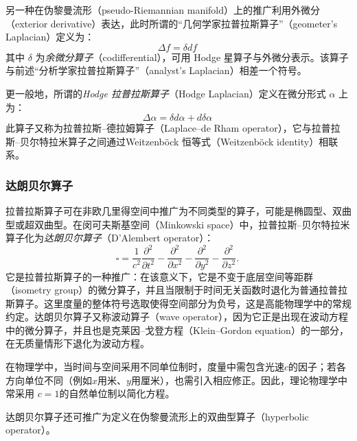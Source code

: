 另一种在伪黎曼流形（pseudo-Riemannian manifold）上的推广利用外微分（exterior derivative）表达，此时所谓的“几何学家拉普拉斯算子”（geometer’s Laplacian）定义为：
\[
\Delta f = \delta d f~
\]
其中 $\delta$ 为\emph{余微分算子}（codifferential），可用 Hodge 星算子与外微分表示。该算子与前述“分析学家拉普拉斯算子”（analyst’s Laplacian）相差一个符号。

更一般地，所谓的\emph{Hodge 拉普拉斯算子}（Hodge Laplacian）定义在微分形式 $\alpha$ 上为：
\[
\Delta \alpha = \delta d \alpha + d \delta \alpha~
\]
此算子又称为拉普拉斯–德拉姆算子（Laplace–de Rham operator），它与拉普拉斯–贝尔特拉米算子之间通过Weitzenböck 恒等式（Weitzenböck identity）相联系。
\subsubsection{达朗贝尔算子}
拉普拉斯算子可在非欧几里得空间中推广为不同类型的算子，可能是椭圆型、双曲型或超双曲型。在闵可夫斯基空间（Minkowski space）中，拉普拉斯–贝尔特拉米算子化为\emph{达朗贝尔算子}（D’Alembert operator）：
\[
\square
= \frac{1}{c^{2}} \frac{\partial^{2}}{\partial t^{2}}
- \frac{\partial^{2}}{\partial x^{2}}
- \frac{\partial^{2}}{\partial y^{2}}
- \frac{\partial^{2}}{\partial z^{2}}.~
\]
它是拉普拉斯算子的一种推广：在该意义下，它是不变于底层空间等距群（isometry group）的微分算子，并且当限制于时间无关函数时退化为普通拉普拉斯算子。这里度量的整体符号选取使得空间部分为负号，这是高能物理学中的常规约定。达朗贝尔算子又称波动算子（wave operator），因为它正是出现在波动方程中的微分算子，并且也是克莱因–戈登方程（Klein–Gordon equation）的一部分，在无质量情形下退化为波动方程。

在物理学中，当时间与空间采用不同单位制时，度量中需包含光速$c$的因子；若各方向单位不同（例如$x$用米、$y$用厘米），也需引入相应修正。因此，理论物理学中常采用 $c = 1$的自然单位制以简化方程。

达朗贝尔算子还可推广为定义在伪黎曼流形上的双曲型算子（hyperbolic operator）。
